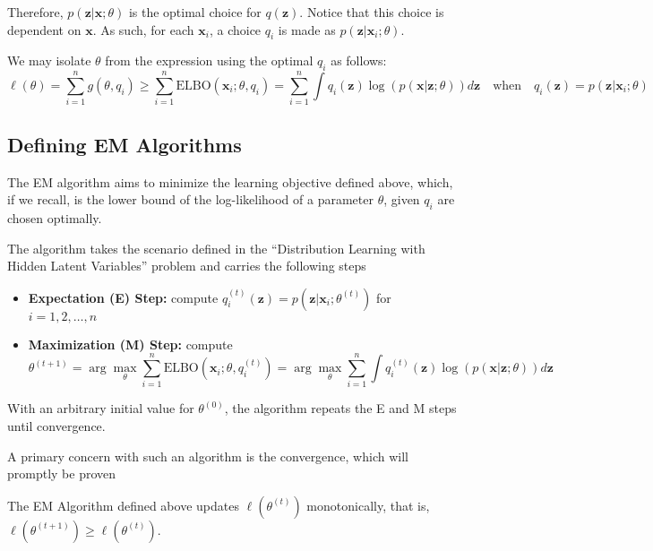 Therefore, $p(\mathbf{z}|\mathbf{x};\theta)$ is the optimal choice for $q(\mathbf{z})$. Notice that this choice is dependent on $\mathbf{x}$. As such, for each $\mathbf{x}_i$, a choice $q_i$ is made as $p(\mathbf{z}|\mathbf{x}_i;\theta)$.
\begin{definition}
    We may isolate $\theta$ from the expression using the optimal $q_i$ as follows:
    \[
        \ell(\theta) = \sum_{i=1}^n g(\theta,q_i) \ge \sum_{i=1}^n \text{ELBO}(\mathbf{x}_i;\theta,q_i) = \sum_{i=1}^n \int q_i(\mathbf{z}) \log(p(\mathbf{x}|\mathbf{z};\theta)) d\mathbf{z} \quad\text{when}\quad q_i(\mathbf{z})=p(\mathbf{z}|\mathbf{x}_i;\theta)
    \]
\end{definition}
\subsection{Defining EM Algorithms}
The EM algorithm aims to minimize the learning objective defined above, which, if we recall, is the lower bound of the log-likelihood of a parameter $\theta$, given $q_i$ are chosen optimally.
\begin{definition}[EM Algorithm]
    The algorithm takes the scenario defined in the ``Distribution Learning with Hidden Latent Variables'' problem and carries the following steps
    \begin{itemize}
        \item \textbf{Expectation (E) Step:} compute $q_i^{(t)}(\mathbf{z})=p(\mathbf{z}|\mathbf{x}_i;\theta^{(t)})$ for $i=1,2,\dots,n$
        \item \textbf{Maximization (M) Step:} compute
        \[
            \theta^{(t+1)} = \arg\max_{\theta} \sum_{i=1}^n \text{ELBO}(\mathbf{x}_i;\theta,q_i^{(t)}) = \arg\max_{\theta} \sum_{i=1}^n \int q_i^{(t)}(\mathbf{z}) \log(p(\mathbf{x}|\mathbf{z};\theta)) d\mathbf{z}
        \]
    \end{itemize}
    With an arbitrary initial value for $\theta^{(0)}$, the algorithm repeats the E and M steps until convergence.
\end{definition}
A primary concern with such an algorithm is the convergence, which will promptly be proven
\begin{theorem}
    The EM Algorithm defined above updates $\ell(\theta^{(t)})$ monotonically, that is, $\ell(\theta^{(t+1)})\ge \ell(\theta^{(t)})$.
\end{theorem}
